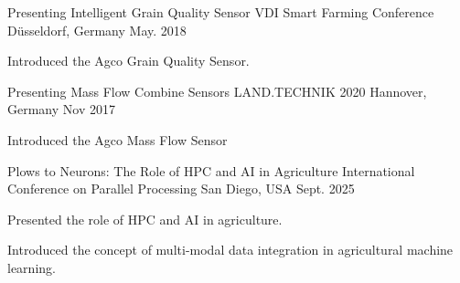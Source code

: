 

\begin{cventries}

  \cventry
    {Presenting Intelligent Grain Quality Sensor} %
    {VDI Smart Farming Conference} %
    {Düsseldorf, Germany} %
    {May. 2018} %
    {
      \begin{cvitems} %
        \item {Introduced the Agco Grain Quality Sensor.}
      \end{cvitems}
    }

  \cventry
    {Presenting Mass Flow Combine Sensors} %
    {LAND.TECHNIK 2020} %
    {Hannover, Germany} %
    {Nov 2017} %
    {
      \begin{cvitems} %
        \item {Introduced the Agco Mass Flow Sensor}
      \end{cvitems}
    }

  \cventry
    {Plows to Neurons: The Role of HPC and AI in Agriculture} %
    {International Conference on Parallel Processing} %
    {San Diego, USA} %
    {Sept. 2025} %
    {
      \begin{cvitems} %
        \item {Presented the role of HPC and AI in agriculture.}
        \item {Introduced the concept of multi-modal data integration in agricultural machine learning.}
      \end{cvitems}
    }
\end{cventries}
